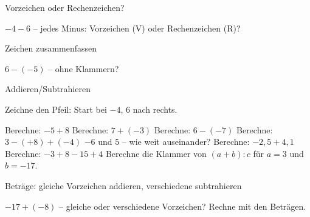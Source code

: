 \setcounter{aufgabe}{12}

\begin{aufgabe}{Vorzeichen oder Rechenzeichen?}
\begin{teile}
\teil $-4 - 6$ – jedes Minus: Vorzeichen (V) oder Rechenzeichen (R)? \leerfeld
\end{teile}
\end{aufgabe}

\begin{aufgabe}{Zeichen zusammenfassen}
\begin{teile}
\teil $6 - (-5)$ – ohne Klammern? \leerfeld
\end{teile}
\end{aufgabe}

\begin{aufgabe}{Addieren/Subtrahieren}
\begin{teile}
\teil Zeichne den Pfeil: Start bei $-4$, $6$ nach rechts.

\zahlenstrahl[xmin=-8,xmax=8,xstep=1]{}
\teil Berechne: $-5 + 8$ \leerfeld
\teil Berechne: $7 + (-3)$ \leerfeld
\teil Berechne: $6 - (-7)$ \leerfeld
\teil Berechne: $3 - (+8) + (-4)$ \leerfeld
\teil $-6$ und $5$ – wie weit auseinander? \leerfeld
\teil Berechne: $-2{,}5 + 4{,}1$ \leerfeld
\teil Berechne: $-3 + 8 - 15 + 4$ \leerfeld
\teil Berechne die Klammer von $(a + b) : c$ für $a = 3$ und $b = -17$. \leerfeld
\end{teile}
\end{aufgabe}

\begin{aufgabe}{Beträge: gleiche Vorzeichen addieren, verschiedene subtrahieren}
\begin{teile}
\teil $-17 + (-8)$ – gleiche oder verschiedene Vorzeichen? Rechne mit den Beträgen. \leerfeld
\end{teile}
\end{aufgabe}

